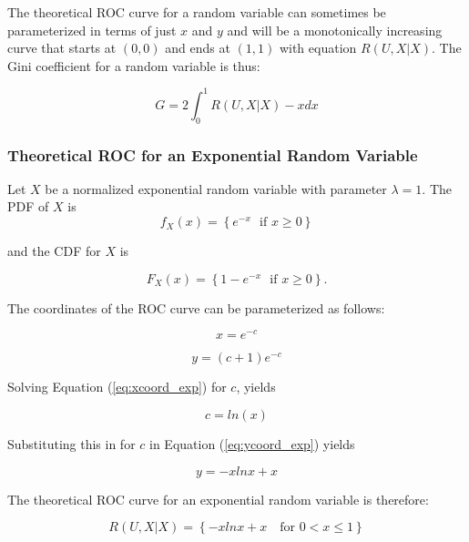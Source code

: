\documentclass[12pt]{article} %
\theoremstyle{plain}
\begin{document}
The theoretical ROC curve for a random variable can sometimes be parameterized in terms of just $x$ and $y$ and will be a monotonically increasing curve that starts at $(0, 0)$ and ends at $(1, 1)$ with equation $R(U,X|X)$. The Gini coefficient for a random variable is thus:

\begin{equation} \label{eq:Gini}
	G = 2\int_0^1 R(U,X|X) -x  dx 
\end{equation}

\subsubsection{Theoretical ROC for an Exponential Random Variable}

 Let $X$ be a normalized exponential random variable with parameter $\lambda =1 $. The PDF of $X$ is 
 \begin{equation}
 f_X(x) = \left\{
 	 e^{- x}  \ \ \ \mbox{if } x \geq 0 
	\right\}
\end{equation}   

\noindent and the CDF for $X$ is 

 \begin{equation}
	F_X(x) = \left\{
		1- e^{- x}  \ \ \ \mbox{if } x \geq 0 
	\right\} .
\end{equation}  

The coordinates of the ROC curve can be parameterized as follows:

\begin{equation} \label{eq:xcoord_exp}
	x=e^{- c}
\end{equation}

\begin{equation} \label{eq:ycoord_exp}
	y = (c +1)e^{-c}
\end{equation}

Solving Equation (\ref{eq:xcoord_exp}) for $c$, yields

\begin{equation}
	c = ln(x)
\end{equation}

Substituting this in for $c$ in Equation (\ref{eq:ycoord_exp}) yields

\begin{equation}
	y =  -xlnx+x
\end{equation}

The theoretical ROC curve for an exponential random variable is therefore:

\begin{equation}
	R(U,X|X) = \left\{
		-xlnx+x \ \ \  \text{ for } 0 < x \leq 1 
\right\}
\end{equation}
\end{document}
